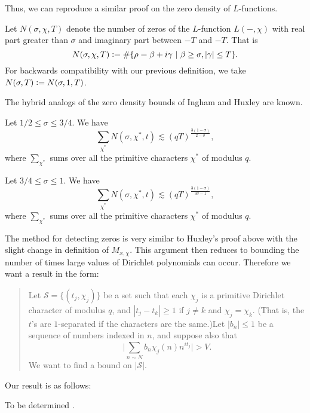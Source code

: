 Thus, we can reproduce a similar proof on the zero density of $L$-functions. 
\begin{definition}
    Let $N(\sigma,\chi,T)$ denote the number of zeros of the $L$-function $L(-,\chi)$ with real part greater than $\sigma$ and imaginary part between $-T$ and $-T$. That is \[
    N(\sigma,\chi,T) \mathrel{\mathop:}= \#\{\rho=\beta+i\gamma \ | \ \beta\geq \sigma, |\gamma|\leq T\}.
    \]
    For backwards compatibility with our previous definition, we take $N(\sigma,T)\mathrel{\mathop:}= N(\sigma, 1,T)$.
\end{definition}
The hybrid analogs of the zero density bounds of Ingham and Huxley are known.
\begin{theorem}
    Let $1/2\leq \sigma\leq 3/4$. We have \[
        \sum_{\chi^* }N(\sigma,\chi^*,t)\lesssim (qT)^{\frac{3(1-\sigma)}{2-\sigma}},
        \]
        where $\sum_{\chi^*}$ sums over all the primitive characters $\chi^*$ of modulus $q$.
\end{theorem}
\begin{theorem}
    Let $3/4\leq \sigma\leq 1$. We have \[
        \sum_{\chi^* }N(\sigma,\chi^*,t)\lesssim (qT)^{\frac{3(1-\sigma)}{3\sigma-1}},
        \]        
        where $\sum_{\chi^*}$ sums over all the primitive characters $\chi^*$ of modulus $q$.
\end{theorem}

The method for detecting zeros is very similar to Huxley's proof above with the slight change in definition of $M_{x,\chi}$. This argument then reduces to bounding the number of times large values of Dirichlet polynomials can occur. Therefore we want a result in the form:
\begin{quotation}  
Let $\mathcal{S}=\{(t_j,\chi_j)\}$ be a set such that each $\chi_j$ is a primitive Dirichlet character of modulus $q$, and $|t_j-t_k|\geq 1$ if $j\neq k$ and $\chi_j=\chi_k$. (That is, the $t$'s are $1$-separated if the characters are the same.)Let $|b_n|\leq 1$ be a sequence of numbers indexed in $n$, and suppose also that \[
\Bigg|\sum_{n\sim N} b_n\chi_j(n)n^{it_j} \Bigg|>V.
\]
We want to find a bound on $|\mathcal{S}|$.
\end{quotation}


Our result is as follows: 
\begin{theorem}
    To be determined \textrm{\smiley}.
\end{theorem}

